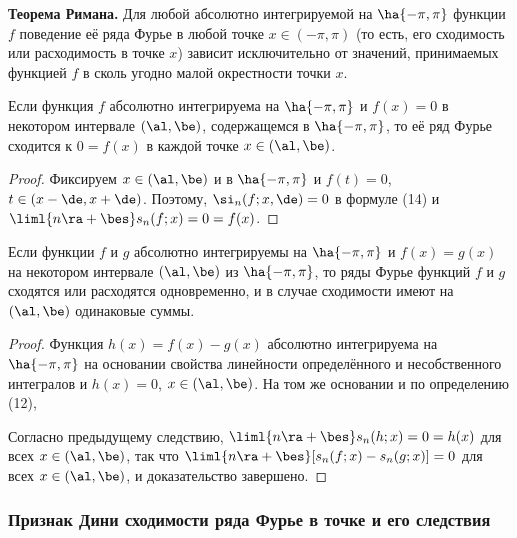 \documentclass[a4paper]{article}
\newenvironment{imp*}{\par\vskip\theoremskip\textbf{Следствие.}\normalfont \itshape}{\par\vskip\theoremskip}
\begin{document}
\textbf{Теорема Римана.} Для любой абсолютно интегрируемой на
$\ha{-\pi,\pi}$ функции $f$ поведение её ряда Фурье в любой точке
$x\in(-\pi,\pi)$ (то есть, его сходимость или расходимость в точке
$x$) зависит исключительно от значений, принимаемых функцией $f$ в
сколь угодно малой окрестности точки $x$.

\begin{imp*}
Если функция $f$ абсолютно интегрируема на $\ha{-\pi,\pi}$ и
$f(x)=0$ в некотором интервале $(\al,\be)$, содержащемся в
$\ha{-\pi,\pi}$, то её ряд Фурье сходится к $0=f(x)$ в каждой точке
$x\in(\al,\be)$.
\end{imp*}

\begin{proof}
Фиксируем $x\in(\al,\be)$ и в $\ha{-\pi,\pi}$ и $f(t)=0$, $t\in
(x-\de,x+\de)$. Поэтому, $\si_n(f;x,\de)=0$ в формуле (14) и
$\liml{n\ra+\bes} s_n(f;x)=0=f(x)$.
\end{proof}

\begin{imp*}
Если функции $f$ и $g$ абсолютно интегрируемы на $\ha{-\pi,\pi}$ и
$f(x)=g(x)$ на некотором интервале $(\al,\be)$ из $\ha{-\pi,\pi}$,
то ряды Фурье функций $f$ и $g$ сходятся или расходятся
одновременно, и в случае сходимости имеют на $(\al,\be)$ одинаковые
суммы.
\end{imp*}

\begin{proof}
Функция $h(x) = f(x)-g(x)$ абсолютно интегрируема на $\ha{-\pi,\pi}$
на основании свойства линейности определённого и несобственного
интегралов и $h(x)=0$, $x\in(\al,\be)$. На том же основании и по
определению (12), 

Согласно предыдущему следствию, $\liml{n\ra+\bes} s_n(h;x)=0=h(x)$
для всех $x\in(\al,\be)$, так что $\liml{n\ra+\bes} [s_n(f;x) -
s_n(g;x)]=0$ для всех $x\in(\al,\be)$, и доказательство завершено.
\end{proof}

\subsubsection{Признак Дини сходимости ряда Фурье в точке и его
следствия}
\end{document}
